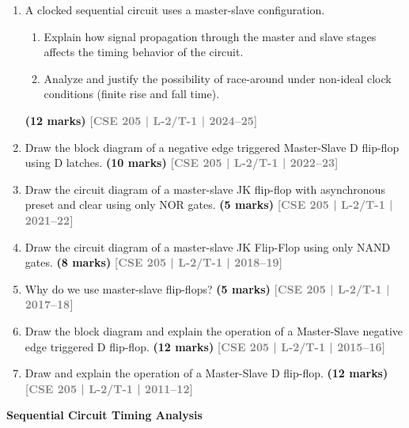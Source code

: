 \documentclass[12pt,a3paper]{article}
\newcommand{\yr}[1]{\hfill\textcolor{gray}{\small\textbf{[#1]}}}
\newcommand{\mk}[1]{\textcolor{orange!70!black}{\small\textbf{(#1 marks)}}}
\newcommand{\subtopic}[2]{%
  \vspace{10pt}
  \noindent\begin{tcolorbox}[colback=#1!8,colframe=#1,boxrule=0.6pt,arc=4pt,
    left=6pt,right=6pt,top=4pt,bottom=4pt]
    \small\bfseries\textcolor{#1}{#2}
  \end{tcolorbox}
  \vspace{2pt}
}
\begin{document}
\begin{enumerate}

\item A clocked sequential circuit uses a master-slave configuration.
\begin{enumerate}
  \item Explain how signal propagation through the master and slave stages affects the timing behavior of the circuit.
  \item Analyze and justify the possibility of race-around under non-ideal clock conditions (finite rise and fall time).
\end{enumerate}
\mk{12} \yr{CSE 205 | L-2/T-1 | 2024--25}

\item Draw the block diagram of a negative edge triggered Master-Slave D flip-flop using D latches.
\mk{10} \yr{CSE 205 | L-2/T-1 | 2022--23}

\item Draw the circuit diagram of a master-slave JK flip-flop with asynchronous preset and clear using only NOR gates.
\mk{5} \yr{CSE 205 | L-2/T-1 | 2021--22}

\item Draw the circuit diagram of a master-slave JK Flip-Flop using only NAND gates.
\mk{8} \yr{CSE 205 | L-2/T-1 | 2018--19}

\item Why do we use master-slave flip-flops?
\mk{5} \yr{CSE 205 | L-2/T-1 | 2017--18}


\item Draw the block diagram and explain the operation of a Master-Slave negative edge triggered D flip-flop.
\mk{12} \yr{CSE 205 | L-2/T-1 | 2015--16}


\item Draw and explain the operation of a Master-Slave D flip-flop.
\mk{12} \yr{CSE 205 | L-2/T-1 | 2011--12}


\end{enumerate}

\subtopic{cE}{Sequential Circuit Timing Analysis}
\label{sub:s5-timing}
\end{document}
